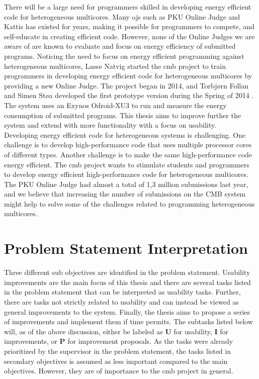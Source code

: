 There will be a large need for programmers skilled in developing energy efficient code for heterogeneous multicores. Many \glspl{oj} such as PKU Online Judge \cite{PKU} and Kattis \cite{KATTIS} has existed for years, making it possible for programmers to compete, and self-educate in creating efficient code. However, none of the Online Judges we are aware of are known to evaluate and focus on energy efficiency of submitted programs. Noticing the need to focus on energy efficient programming against heterogeneous multicores, Lasse Natvig started the \gls{cmb} project to train programmers in developing energy efficient code for heterogeneous multicores by providing a new Online Judge. The project began in 2014, and Torbjørn Follan and Simen Støa developed the first prototype version during the Spring of 2014 \cite{mt:T&S}. The system uses an Exynos Odroid-XU3 \cite{XU3} to run and measure the energy consumption of submitted programs. This thesis aims to improve further the system and extend with more functionality with a focus on usability. \\

Developing energy efficient code for heterogeneous systems is challenging. One challenge is to develop high-performance code that uses multiple processor cores of different types. Another challenge is to make the same high-performance code energy efficient. The \gls{cmb} project wants to stimulate students and programmers to develop energy efficient high-performance code for heterogeneous multicores. The PKU Online Judge \cite{PKU} had almost a total of 1,3 million submissions last year, and we believe that increasing the number of submissions on the CMB system might help to solve some of the challenges related to programming heterogeneous multicores. \\

\clearpage

\section{Problem Statement Interpretation}
\label{sec:ps-inter}
Three different sub objectives are identified in the problem statement. Usability improvements are the main focus of this thesis and there are several tasks listed in the problem statement that can be interpreted as usability tasks. Further, there are tasks not strictly related to usability and can instead be viewed as general improvements to the system. Finally, the thesis aims to propose a series of improvements and implement them if time permits. The subtasks listed below will, as of the above discussion, either be labeled as \textbf{U} for usability, \textbf{I} for improvements, or \textbf{P} for improvement proposals. As the tasks were already prioritized by the supervisor in the problem statement, the tasks listed in secondary objectives is assumed as less important compared to the main objectives. However, they are of importance to the \gls{cmb} project in general.

